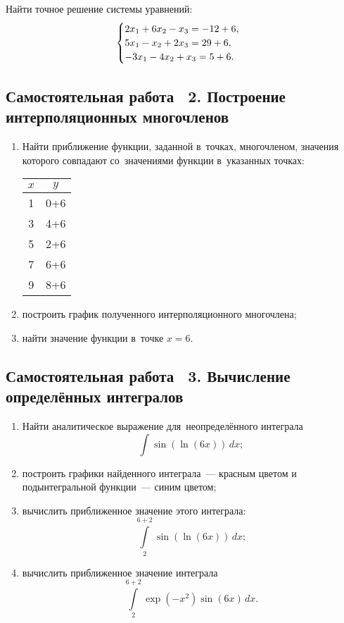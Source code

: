 \documentclass[10pt, a4paper, titlepage]{article}
\begin{document}
Найти точное решение системы уравнений:
\begin{equation*}
    \begin{cases}
        $$2x_1+6x_2-x_3 = -12+6$$, \\
        $$5x_1-x_2+2x_3 = 29+6$$, \\
        $$-3x_1-4x_2+x_3 = 5+6$$.
    \end{cases}
\end{equation*}

\subsection*{Самостоятельная работа \textnumero~2. Построение интерполяционных многочленов}

\begin{enumerate}
    \item Найти приближение функции, заданной в~точках, многочленом, значения которого совпадают со~значениями функции в~указанных точках:
    \begin{center}
    	\begin{tabular}{SC}
    		\toprule
    		
    		$x$ & $y$ \\
    		
    		\midrule
    		
    		1 & 0+6 \\
    		3 & 4+6 \\
    		5 & 2+6 \\
    		7 & 6+6 \\
    		9 & 8+6 \\
    		
    		\bottomrule
    	\end{tabular}
    \end{center}
    \item построить график полученного интерполяционного многочлена;
    \item найти значение функции в~точке $x=6$.
\end{enumerate}

\subsection*{Самостоятельная работа \textnumero~3. Вычисление определённых интегралов}

\begin{enumerate}
    \item Найти аналитическое выражение для~неопределённого интеграла $$\int \sin(\ln(6x))\,dx ;$$
    \item построить графики найденного интеграла~--- красным цветом и подынтегральной функции~--- синим цветом;
    \item вычислить приближенное значение этого интеграла: $$\int\limits_2^{6+2} \sin(\ln(6x))\,dx ;$$
    \item вычислить приближенное значение интеграла $$\int\limits_2^{6+2} \exp(-x^2)\sin(6x)\,dx .$$
\end{enumerate}
\end{document}
